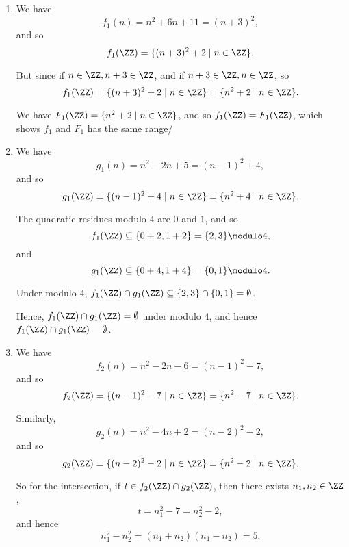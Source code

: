\Question{\currfilebase}
\begin{enumerate}
    \item We have
          \[
              f_1 (n) = n^2 + 6n + 11 = (n + 3)^2,
          \]
          and so
          \[
              f_1(\ZZ) = \{(n + 3)^2 + 2 \mid n \in \ZZ\}.
          \]

          But since if \(n \in \ZZ, n + 3 \in \ZZ\), and if \(n + 3 \in \ZZ, n \in \ZZ\), so
          \[
              f_1(\ZZ) = \{(n + 3)^2 + 2 \mid n \in \ZZ\} = \{n^2 + 2 \mid n \in \ZZ\}.
          \]

          We have \(F_1(\ZZ) = \{n^2 + 2 \mid n \in \ZZ\}\), and so \(f_1(\ZZ) = F_1(\ZZ)\), which shows \(f_1\) and \(F_1\) has the same range/

    \item We have
          \[
              g_1(n) = n^2 - 2n + 5 = (n - 1)^2 + 4,
          \]
          and so
          \[
              g_1(\ZZ) = \{(n - 1)^2 + 4 \mid n \in \ZZ\} = \{n^2 + 4 \mid n \in \ZZ\}.
          \]

          The quadratic residues modulo \(4\) are \(0\) and \(1\), and so
          \[
              f_1(\ZZ) \subseteq \{0 + 2, 1 + 2\} = \{2, 3\} \modulo 4,
          \]
          and
          \[
              g_1(\ZZ) \subseteq \{0 + 4, 1 + 4\} = \{0, 1\} \modulo 4.
          \]

          Under modulo \(4\), \(f_1(\ZZ) \cap g_1(\ZZ) \subseteq \{2, 3\} \cap \{0, 1\} = \emptyset\).

          Hence, \(f_1(\ZZ) \cap g_1(\ZZ) = \emptyset\) under modulo \(4\), and hence \(f_1(\ZZ) \cap g_1(\ZZ) = \emptyset\).

    \item We have
          \[
              f_2(n) = n^2 - 2n - 6 = (n - 1)^2 - 7,
          \]
          and so
          \[
              f_2(\ZZ) = \{(n - 1)^2 - 7 \mid n \in \ZZ\} = \{n^2 - 7 \mid n \in \ZZ\}.
          \]

          Similarly,
          \[
              g_2(n) = n^2 - 4n + 2 = (n - 2)^2 - 2,
          \]
          and so
          \[
              g_2(\ZZ) = \{(n - 2)^2 - 2 \mid n \in \ZZ\} = \{n^2 - 2 \mid n \in \ZZ\}.
          \]

          So for the intersection, if \(t \in f_2(\ZZ) \cap g_2(\ZZ)\), then there exists \(n_1, n_2 \in \ZZ\),
          \[
              t = n_1^2 - 7 = n_2^2 - 2,
          \]
          and hence
          \[
              n_1^2 - n_2^2 = (n_1 + n_2) (n_1 - n_2) = 5.
          \]


\end{enumerate}
